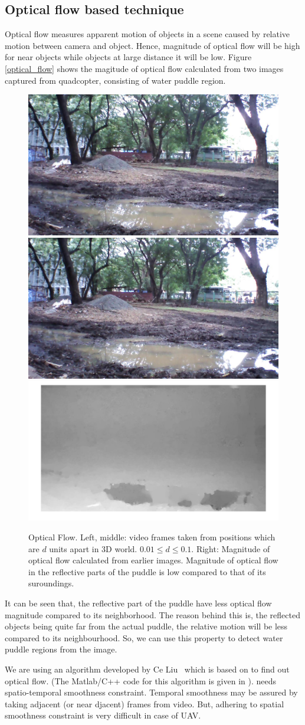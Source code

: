 \documentclass[times,10pt,twocolumn,letterpaper]{article}
\begin{document}
\subsection{Optical flow based technique}
Optical flow measures apparent motion of objects in a scene caused by relative
motion between camera and object. Hence, magnitude of optical flow will be high
for near objects while objects at large distance it will be low. Figure
\ref{optical_flow} shows the magitude of optical flow calculated from two images
captured from quadcopter, consisting of water puddle region. 

\begin{figure}[h!]
\centering
\includegraphics[width=0.3\linewidth]{images/IMG_PAIR_1_1.jpg}
\includegraphics[width=0.3\linewidth]{images/IMG_PAIR_1_2.jpg}
\includegraphics[width=0.3\linewidth]{images/optical_flow_magnitude.jpg}
\caption{Optical Flow. Left, middle: video frames taken from positions
which are $d$ units apart in 3D world. $ 0.01 \leq d \leq 0.1$. Right:
Magnitude of optical flow calculated from earlier images. Magnitude of optical
flow in the reflective parts of the puddle is low compared to that of its
suroundings.}
\label{fig:optical_flow}
\end{figure}

It can be seen that, the reflective part of the puddle have less optical flow
magnitude compared to its neighborhood. The reason behind this is, the reflected objects being quite far
from the actual puddle, the relative motion will be less compared to its
neighbourhood. So, we can use this property to detect water puddle regions from
the image.

We are using an algorithm  developed by Ce Liu~\cite{Liu11Thesis} which is based
on \cite{Brox04,Bruhn05} to find out optical flow. (The Matlab/C++ code for this
algorithm is given in \cite{Liu11}). \cite{Brox04} needs spatio-temporal
smoothness constraint. Temporal smoothness may be assured by taking adjacent (or
near djacent) frames from video. But, adhering to spatial smoothness constraint
is very difficult in case of UAV. 
\end{document}
